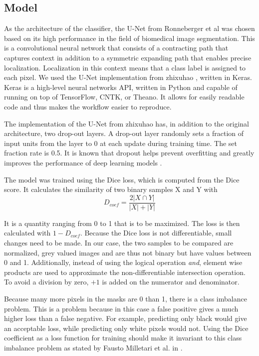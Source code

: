 \subsection{Model}
As the architecture of the classifier, the U-Net from Ronneberger et al \cite{ronneberger_u-net:_2015} was chosen based on its high performance in the field of biomedical image segmentation.
This is a convolutional neural network that consists of a contracting path that captures context in addition to a symmetric expanding path that enables precise localization.
Localization in this context means that a class label is assigned to each pixel.
We used the U-Net implementation from zhixuhao \cite{zhixuhao_zhixuhao/unet_2020}, written in Keras.
Keras is a high-level neural networks API, written in Python and capable of running on top of TensorFlow, CNTK, or Theano.
It allows for easily readable code and thus makes the workflow easier to reproduce.

The implementation of the U-Net from zhixuhao has, in addition to the original architecture, two drop-out layers.
A drop-out layer randomly sets a fraction of input units from the layer to 0 at each update during training time.
The set fraction rate is 0.5.
It is known that dropout helps prevent overfitting and greatly improves the performance of deep learning models \cite{srivastava2014dropout}.

The model was trained using the Dice loss, which is computed from the Dice score.
It calculates the similarity of two binary samples X and Y with
\begin{equation}\label{eqDcoef}
D_{coef} = \frac{2|X\cap Y|}{|X|+|Y|}
\end{equation}

It is a quantity ranging from 0 to 1 that is to be maximized.
The loss is then calculated with $1-D_{coef}$.
Because the Dice loss is not differentiable, small changes need to be made.
In our case, the two samples to be compared are normalized, grey valued images and are thus not binary but have values between 0 and 1.
Additionally, instead of using the logical operation \textit{and}, element wise products are used to approximate the non-differentiable intersection operation.
To avoid a division by zero, $+1$ is added on the numerator and denominator.

Because many more pixels in the masks are 0 than 1, there is a class imbalance problem.
This is a problem because in this case a false positive gives a much higher loss than a false negative.
For example, predicting only black would give an acceptable loss, while predicting only white pixels would not.
Using the Dice coefficient as a loss function for training should make it invariant to this class imbalance problem as stated by Fausto Milletari et al. in \cite{milletari_v-net:_2016}.

